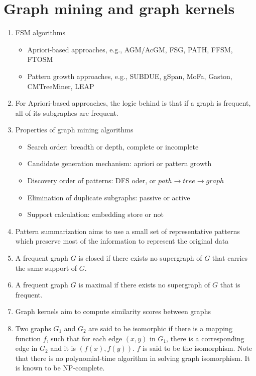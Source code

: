 \documentclass[14pt]{article}
\begin{document}
\section{Graph mining and graph kernels}
\begin{enumerate}
 \item FSM algorithms
  \begin{itemize}
   \item Apriori-based approaches, e.g., AGM/AcGM, FSG, PATH, FFSM, FTOSM
   \item Pattern growth approaches, e.g., SUBDUE, gSpan, MoFa, Gaston, CMTreeMiner, LEAP
  \end{itemize}
 
 \item For Apriori-based approaches, the logic behind is that if a graph is frequent, all of its subgraphes are frequent.
 
 \item Properties of graph mining algorithms
  \begin{itemize}
   \item Search order: breadth or depth, complete or incomplete
   \item Candidate generation mechanism: apriori or pattern growth
   \item Discovery order of patterns: DFS oder, or $path \rightarrow tree \rightarrow graph$
   \item Elimination of duplicate subgraphs: passive or active
   \item Support calculation: embedding store or not
  \end{itemize}
 
 \item Pattern summarization aims to use a small set of representative patterns which preserve most of the information to represent the original data
 
 \item A frequent graph $G$ is closed if there exists no supergraph of $G$ that carries the same support of $G$.
 
 \item A frequent graph $G$ is maximal if there exists no supergraph of $G$ that is frequent.
 
 \item Graph kernels aim to compute similarity scores between graphs
 
 \item Two graphs $G_1$ and $G_2$ are said to be isomorphic if there is a mapping function $f$, such that for each edge $(x,y)$ in $G_1$, there is a corresponding edge in $G_2$ and it is $(f(x), f(y))$. $f$ is said to be the isomorphism. Note that there is no polynomial-time algorithm in solving graph isomorphism. It is known to be NP-complete.
 

\end{enumerate}
\end{document}
